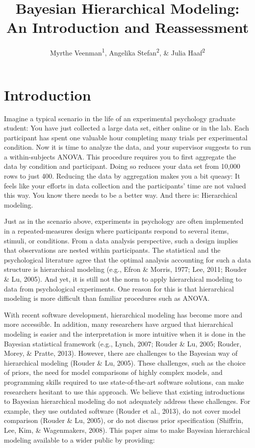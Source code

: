 \documentclass[
  english,
  doc,floatsintext]{apa6}
\title{Bayesian Hierarchical Modeling: An Introduction and Reassessment}
\author{Myrthe Veenman\textsuperscript{1}, Angelika Stefan\textsuperscript{2}, \& Julia Haaf\textsuperscript{2}}
\date{}
\affiliation{\vspace{0.5cm}\textsuperscript{1} Leiden University\\\textsuperscript{2} University of Amsterdam}
\begin{document}
\maketitle

\newpage

\hypertarget{introduction}{%
\section{Introduction}\label{introduction}}

Imagine a typical scenario in the life of an experimental psychology graduate student: You have just collected a large data set, either online or in the lab. Each participant has spent one valuable hour completing many trials per experimental condition. Now it is time to analyze the data, and your supervisor suggests to run a within-subjects ANOVA. This procedure requires you to first aggregate the data by condition and participant. Doing so reduces your data set from 10,000 rows to just 400. Reducing the data by aggregation makes you a bit queasy: It feels like your efforts in data collection and the participants' time are not valued this way. You know there needs to be a better way. And there is: Hierarchical modeling.

Just as in the scenario above, experiments in psychology are often implemented in a repeated-measures design where participants respond to several items, stimuli, or conditions. From a data analysis perspective, such a design implies that observations are nested within participants. The statistical and the psychological literature agree that the optimal analysis accounting for such a data structure is hierarchical modeling (e.g., Efron \& Morris, 1977; Lee, 2011; Rouder \& Lu, 2005). And yet, it is still not the norm to apply hierarchical modeling to data from psychological experiments. One reason for this is that hierarchical modeling is more difficult than familiar procedures such as ANOVA.

With recent software development, hierarchical modeling has become more and more accessible. In addition, many researchers have argued that hierarchical modeling is easier and the interpretation is more intuitive when it is done in the Bayesian statistical framework (e.g., Lynch, 2007; Rouder \& Lu, 2005; Rouder, Morey, \& Pratte, 2013).
However, there are challenges to the Bayesian way of hierarchical modeling (Rouder \& Lu, 2005). These challenges, such as the choice of priors, the need for model comparisons of highly complex models, and programming skills required to use state-of-the-art software solutions, can make researchers hesitant to use this approach. We believe that existing introductions to Bayesian hierarchical modeling do not adequately address these challenges. For example, they use outdated software (Rouder et al., 2013), do not cover model comparison (Rouder \& Lu, 2005), or do not discuss prior specification (Shiffrin, Lee, Kim, \& Wagenmakers, 2008). This paper aims to make Bayesian hierarchical modeling available to a wider public by providing:
\end{document}
